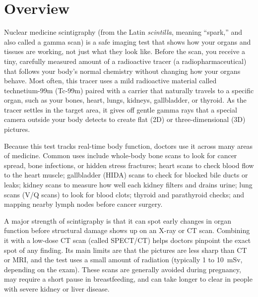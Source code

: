 \label{ch:infographic-nms}

\section{Overview}

Nuclear medicine scintigraphy (from the Latin \textit{scintilla}, meaning ``spark,'' and also called a gamma scan) is a safe imaging test that shows how your organs and tissues are working, not just what they look like. Before the scan, you receive a tiny, carefully measured amount of a radioactive tracer (a radiopharmaceutical) that follows your body's normal chemistry without changing how your organs behave. Most often, this tracer uses a mild radioactive material called technetium-99m (Tc-99m) paired with a carrier that naturally travels to a specific organ, such as your bones, heart, lungs, kidneys, gallbladder, or thyroid. As the tracer settles in the target area, it gives off gentle gamma rays that a special camera outside your body detects to create flat (2D) or three-dimensional (3D) pictures.

Because this test tracks real-time body function, doctors use it across many areas of medicine. Common uses include whole-body bone scans to look for cancer spread, bone infections, or hidden stress fractures; heart scans to check blood flow to the heart muscle; gallbladder (HIDA) scans to check for blocked bile ducts or leaks; kidney scans to measure how well each kidney filters and drains urine; lung scans (V/Q scans) to look for blood clots; thyroid and parathyroid checks; and mapping nearby lymph nodes before cancer surgery.

A major strength of scintigraphy is that it can spot early changes in organ function before structural damage shows up on an X-ray or CT scan. Combining it with a low-dose CT scan (called SPECT/CT) helps doctors pinpoint the exact spot of any finding. Its main limits are that the pictures are less sharp than CT or MRI, and the test uses a small amount of radiation (typically 1 to 10~mSv, depending on the exam). These scans are generally avoided during pregnancy, may require a short pause in breastfeeding, and can take longer to clear in people with severe kidney or liver disease.

